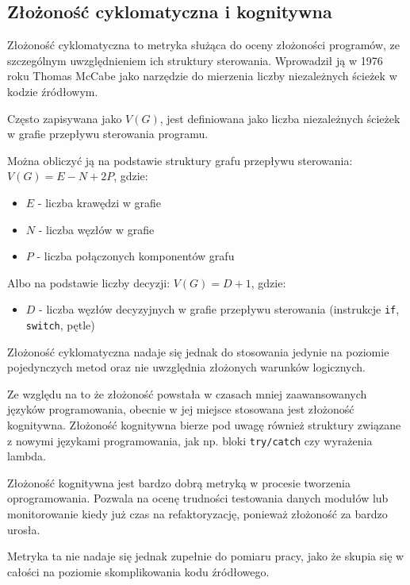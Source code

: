 \subsection{Złożoność cyklomatyczna i kognitywna}
Złożoność cyklomatyczna to metryka służąca do oceny złożoności programów, ze szczególnym uwzględnieniem ich struktury sterowania. Wprowadził ją w 1976 roku Thomas McCabe jako narzędzie do mierzenia
liczby niezależnych ścieżek w kodzie źródłowym. \cite[]{ComplexityMeasure}

Często zapisywana jako $V(G)$, jest definiowana jako liczba niezależnych ścieżek w grafie przepływu sterowania programu.

Można obliczyć ją na podstawie struktury grafu przepływu sterowania:
$V(G) = E - N + 2P$,
gdzie:
\begin{itemize}
    \item $E$ - liczba krawędzi w grafie
    \item $N$ - liczba węzłów w grafie
    \item $P$ - liczba połączonych komponentów grafu
\end{itemize}
Albo na podstawie liczby decyzji:
$V(G) = D + 1$,
gdzie:
\begin{itemize}
    \item $D$ - liczba węzłów decyzyjnych w grafie przepływu sterowania (instrukcje \texttt{if}, \texttt{switch}, pętle)
\end{itemize}
Złożoność cyklomatyczna nadaje się jednak do stosowania jedynie na poziomie pojedynczych metod oraz nie uwzględnia złożonych warunków logicznych.

Ze względu na to że złożoność powstała w czasach mniej zaawansowanych języków programowania, obecnie w jej miejsce stosowana jest złożoność kognitywna. \cite[]{CognitiveComplexity}
Złożoność kognitywna bierze pod uwagę również struktury związane z nowymi językami programowania, jak np. bloki \texttt{try/catch} czy wyrażenia lambda.

Złożoność kognitywna jest bardzo dobrą metryką w procesie tworzenia oprogramowania. Pozwala na ocenę trudności testowania danych modułów lub monitorowanie kiedy już czas na refaktoryzację, ponieważ złożoność za bardzo urosła.

Metryka ta nie nadaje się jednak zupełnie do pomiaru pracy, jako że skupia się w całości na poziomie skomplikowania kodu źródłowego.

